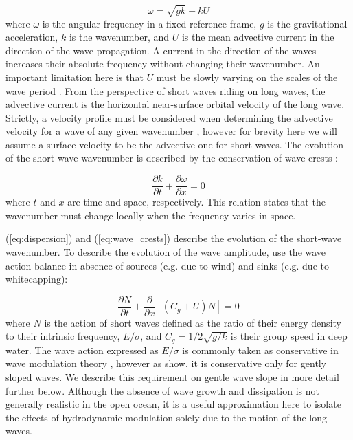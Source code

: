 \documentclass[lineno]{jfm}
\begin{document}
\begin{equation}
\label{eq:dispersion}
\omega = \sqrt{gk} + k U
\end{equation}
where $\omega$ is the angular frequency in a fixed reference frame, $g$ is the
gravitational acceleration, $k$ is the wavenumber, and $U$ is the mean advective
current in the direction of the wave propagation.
A current in the direction of the waves increases their absolute frequency
without changing their wavenumber.
An important limitation here is that $U$ must be slowly varying on the scales of
the wave period \citep{bretherton1968wavetrains}.
From the perspective of short waves riding on long waves, the advective current
is the horizontal near-surface orbital velocity of the long wave.
Strictly, a velocity profile must be considered when determining the
advective velocity for a wave of any given wavenumber \citep{stewart1974hf},
however for brevity here we will assume a surface velocity to be the advective
one for short waves.
The evolution of the short-wave wavenumber is described by the conservation of
wave crests \citep{phillips1981dispersion}:

\begin{equation}
\label{eq:wave_crests}
\dfrac{\partial k}{\partial t}
+ \dfrac{\partial \omega}{\partial x}
= 0
\end{equation}
where $t$ and $x$ are time and space, respectively.
This relation states that the wavenumber must change locally when the frequency
varies in space.

(\ref{eq:dispersion}) and (\ref{eq:wave_crests}) describe the evolution of
the short-wave wavenumber.
To describe the evolution of the wave amplitude, use the wave action balance
\citep{bretherton1968wavetrains} in absence of sources (e.g. due to wind) and
sinks (e.g. due to whitecapping):

\begin{equation}
\label{eq:wave_action}
\dfrac{\partial N}{\partial t}
+ \dfrac{\partial}{\partial x} \left[\left(C_g + U\right)N\right]
= 0
\end{equation}
where $N$ is the action of short waves defined as the ratio of their
energy density to their intrinsic frequency, $E/\sigma$,
and $C_g = 1/2\sqrt{g/k}$ is their group speed in deep water.
The wave action expressed as $E/\sigma$ is commonly taken as
conservative in wave modulation theory
\citep{phillips1981dispersion,longuet1987propagation}, however as
\citet{dysthe1988orbiting} show, it is conservative only for gently sloped waves.
We describe this requirement on gentle wave slope in more detail further below.
Although the absence of wave growth and dissipation is not generally realistic in
the open ocean, it is a useful approximation here to isolate the effects
of hydrodynamic modulation solely due to the motion of the long waves.
\end{document}

